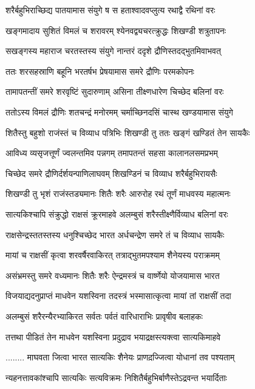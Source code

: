 \twolineshloka
{शरैर्बहुभिराच्छिद्य पातयामास संयुगे ष}
{स हताश्वादवप्लुत्य रथाद्वै रथिनां वरः}


\twolineshloka
{खङ्गमादाय सुशितं विमलं च शरावरम्}
{श्येनवद्व्यचरत्क्रुद्धः शिखण्डी शत्रुतापनः}


\twolineshloka
{सखङ्गस्य महाराज चरतस्तस्य संयुगे}
{नान्तरं ददृशे द्रौणिस्तदद्भुतमिवाभवत्}


\twolineshloka
{ततः शरसहस्राणि बहूनि भरतर्षभ}
{प्रेषयामास समरे द्रौणिः परमकोपनः}


\twolineshloka
{तामापतन्तीं समरे शरवृष्टिं सुदारुणाम्}
{असिना तीक्ष्णधारेण चिच्छेद बलिनां वरः}


\twolineshloka
{ततोऽस्य विमलं द्रौणिः शतचन्द्रं मनोरमम्}
{चर्माच्छिनदसिं चास्थ खण्डयामास संयुगे}


\twolineshloka
{शितैस्तु बहुशो राजंस्तं च विव्याध पत्रिभिः}
{शिखण्डी तु ततः खङ्गं खण्डितं तेन सायकैः}


\twolineshloka
{आविध्य व्यसृजत्तूर्णं ज्वलन्तमिव पन्नगम्}
{तमापतन्तं सहसा कालानलसमप्रभम्}


\twolineshloka
{चिच्छेद समरे द्रौणिर्दर्शयन्पाणिलाघवम्}
{शिखण्डिनं च विव्याध शरैर्बहुभिरायसैः}


\twolineshloka
{शिखण्डी तु भृशं राजंस्तड्यमानः शितैः शरैः}
{आरुरोह रथं तूर्णं माधवस्य महात्मनः}


\twolineshloka
{सात्यकिश्चापि संक्रुद्धो राक्षसं क्रूरमाहवे}
{अलम्बुसं शरैस्तीक्ष्णैर्विव्याध बलिनां वरः}


\twolineshloka
{राक्षसेन्द्रस्ततस्तस्य धनुश्चिच्छेद भारत}
{अर्धचन्द्रेण समरे तं च विव्याध सायकैः}


\twolineshloka
{मायां च राक्षसीं कृत्वा शरवर्षैरवाकिरत्}
{तत्राद्भुतमपश्याम शैनेयस्य पराक्रमम्}


\twolineshloka
{असंभ्रमस्तु समरे वध्यमानः शितैः शरैः}
{ऐन्द्रमस्त्रं च वार्ष्णेयो योजयामास भारत}


\twolineshloka
{विजयाद्यदनुप्राप्तं माधवेन यशस्विना}
{तदस्त्रं भस्मासात्कृत्वा मायां तां राक्षसीं तदा}


\twolineshloka
{अलम्बुसं शरैरन्यैरभ्याकिरत सर्वतः}
{पर्वतं वारिधाराभिः प्रावृषीव बलाहकः}


\twolineshloka
{तत्तथा पीडितं तेन माधवेन यशस्विना}
{प्रदुद्राव भयाद्रक्षस्त्यक्त्वा सात्यकिमाहवे}


\twolineshloka
{........ माघवता जित्वा भारत सात्यकिः}
{शैनेयः प्राणद़ज्जित्वा योधानां तव पश्यताम्}


\twolineshloka
{न्यहनत्तावकांश्चापि सात्यकिः सत्यविक्रमः}
{निशितैर्बहुभिर्बाणैस्तेऽद्रवन्त भयार्दिताः}


